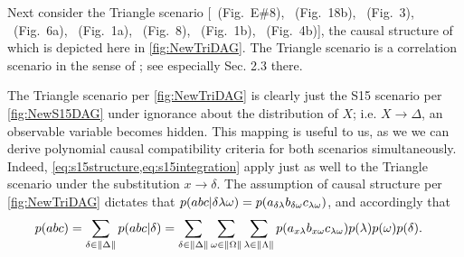 Next consider the Triangle scenario [\citealp{pusey2014gdag}~(Fig.~E\#8), \citealp{WoodSpekkens}~(Fig.~18b), \citealp{fritz2012bell}~(Fig.~3), \citealp{chaves2014novel}~(Fig.~6a), \citealp{Chaves2015infoquantum}~(Fig.~1a), \citealp{BilocalCorrelations}~(Fig.~8), \citealp{steudel2010ancestors}~(Fig.~1b), \citealp{chaves2014informationinference}~(Fig.~4b)], the causal structure of which is depicted here in \cref{fig:NewTriDAG}. The Triangle scenario is a correlation scenario in the sense of \citet{fritz2012bell}; see especially Sec. 2.3 there.

The Triangle scenario per \cref{fig:NewTriDAG} is clearly just the S15 scenario per \cref{fig:NewS15DAG} under ignorance about the distribution of $X$; i.e. $X\to \Delta$, an observable variable becomes hidden. This mapping is useful to us, as we we can derive polynomial causal compatibility criteria for both scenarios simultaneously. Indeed, \cref{eq:s15structure,eq:s15integration} apply just as well to the Triangle scenario under the substitution $x\to \delta$. 
The assumption of causal structure per \cref{fig:NewTriDAG} dictates that $p\lparen a b c | \delta \lambda \omega\rparen=p\lparen a_{\delta \lambda} b_{\delta \omega} c_{\lambda \omega}\rparen$, and accordingly that
\begin{align}\label{eq:triintegration2}
&p\lparen a b c\rparen=\sum\limits_{\delta\in \lVert\Delta\rVert}p\lparen a b c | \delta\rparen= \sum\limits_{\delta\in \lVert\Delta\rVert}\sum\limits_{\omega\in \lVert\Omega\rVert} \sum\limits_{\lambda\in \lVert\Lambda\rVert} p\lparen a_{x \lambda} b_{x \omega} c_{\lambda \omega}\rparen p\lparen\lambda\rparen p\lparen\omega\rparen p\lparen\delta\rparen.
\end{align}

